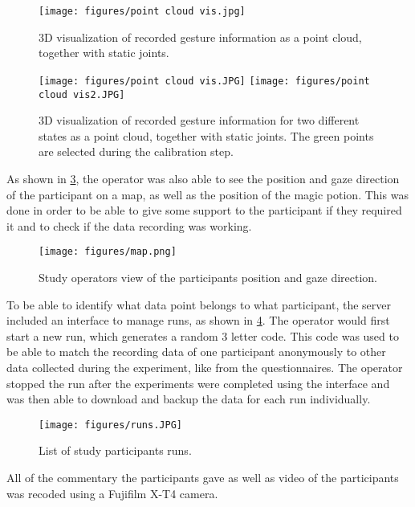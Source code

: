 \begin{figure}[!ht]
    \centering
    \texttt{[image: figures/point cloud vis.jpg]}
    \caption{3D visualization of recorded gesture information as a point cloud, together with static joints.}
    \label{fig:vis}
\end{figure}
\begin{figure}[!htb]
        \texttt{[image: figures/point cloud vis.JPG]}
    \endminipage\hfill
        \texttt{[image: figures/point cloud vis2.JPG]}
        \label{fig:vis}
    \endminipage\hfill
    \caption{3D visualization of recorded gesture information for two different states as a point cloud, together with static joints. The green points are selected during the calibration step.}
\end{figure}

As shown in \ref{fig:map}, the operator was also able to see the position and gaze direction of the participant on a map, as well as the position of the magic potion. This was done in order to be able to give some support to the participant if they required it and to check if the data recording was working. 

\begin{figure}[!ht]
    \centering
    \texttt{[image: figures/map.png]}
    \caption{Study operators view of the participants position and gaze direction.}
    \label{fig:map}
\end{figure}

To be able to identify what data point belongs to what participant, the server included an interface to manage runs, as shown in \ref{fig:runs}. The operator would first start a new run, which generates a random 3 letter code. This code was used to be able to match the recording data of one participant anonymously to other data collected during the experiment, like from the questionnaires. The operator stopped the run after the experiments were completed using the interface and was then able to download and backup the data for each run individually.

\begin{figure}[!ht]
    \centering
    \texttt{[image: figures/runs.JPG]}
    \caption{List of study participants runs.}
    \label{fig:runs}
\end{figure}

All of the commentary the participants gave as well as video of the participants was recoded using a Fujifilm X-T4 camera.

